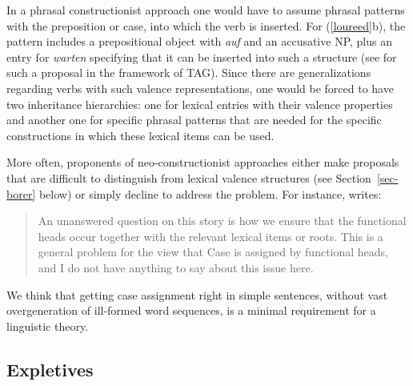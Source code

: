 \begin{exe}
\begin{xlist}[iv.]
\begin{exe}
\begin{xlist}[iv.]
In a phrasal constructionist approach one would have to assume
phrasal patterns with the preposition or case, into which the verb is inserted.  For (\ref{loureed}b), the pattern includes a prepositional object with \emph{auf} and an
accusative NP, plus an entry for \emph{warten} specifying that it can be inserted into such a structure (see  for such a proposal in the framework of TAG). Since there are 
generalizations regarding verbs with such valence representations, one would be forced
to have two inheritance hierarchies: one for lexical entries with their valence properties and
another one for specific phrasal patterns that are needed for the specific constructions in which
these lexical items can be used.  

More often, proponents of neo-constructionist approaches either 
make proposals that are difficult to distinguish from lexical valence structures (see Section~\ref{sec-borer} below)
or simply decline to address the problem.  For instance, \citet{Lohndal2012a} writes:
\begin{quote}
An unanswered question on this story is how we ensure that the functional heads occur together with
the relevant lexical items or roots. This is a general problem for the view that Case is assigned by
functional heads, and I do not have anything to say about this issue here. \citep{Lohndal2012a} %
\end{quote}
We think that 
getting case assignment
right in simple sentences, without vast overgeneration of ill-formed word sequences, is a minimal
requirement for a linguistic theory.  %

\subsection{Expletives}
\label{sec-expletives}


\end{xlist}
\end{exe}
\end{xlist}
\end{exe}
